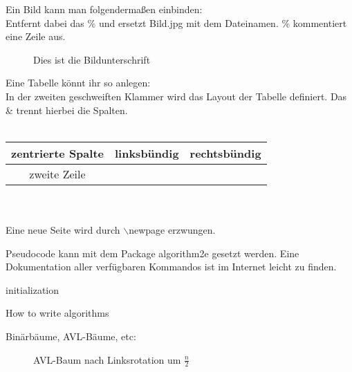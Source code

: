 \documentclass[a4paper]{scrartcl}
\begin{document}
Ein Bild kann man folgendermaßen einbinden: \\
Entfernt dabei das \% und ersetzt Bild.jpg mit dem Dateinamen. \% kommentiert eine Zeile aus.

\begin{figure}[H]
\centering
\caption{Dies ist die Bildunterschrift}
\end{figure}

Eine Tabelle könnt ihr so anlegen:\\
In der zweiten geschweiften Klammer wird das Layout der Tabelle definiert. Das \& trennt hierbei die Spalten.\\
\ \\ %
\begin{tabular}{c|lr}
  zentrierte Spalte & linksbündig & rechtsbündig\\
  \hline
  zweite Zeile & \\
\end{tabular}\\
\ \\
Eine neue Seite wird durch $\backslash$newpage erzwungen.
\newpage


Pseudocode kann mit dem Package algorithm2e gesetzt werden. Eine Dokumentation aller verfügbaren Kommandos ist im Internet leicht zu finden.

\begin{algorithm}[H]
 initialization\;
 \caption{How to write algorithms}
\end{algorithm}

\vspace{1cm}

Binärbäume, AVL-Bäume, etc: \\

\begin{figure}[h!]
\centering
{}
\caption{AVL-Baum nach Linksrotation um $\frac{n}{2}$}
\end{figure}
\end{document}
